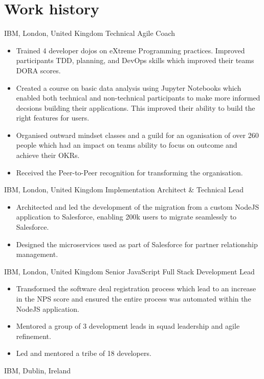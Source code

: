 \section[\faGears]{Work history}
{IBM, London, United Kingdom}
{Technical Agile Coach}
{\begin{itemize}
		\item Trained 4 developer dojos on eXtreme Programming practices.
		      Improved participants TDD, planning, and DevOps skills which improved their teams DORA scores.
		\item Created a course on basic data analysis using Jupyter Notebooks which enabled both
		      technical and non-technical participants to make more informed decsions building their applications.
		      This improved their ability to build the right features for users.
		\item Organised outward mindset classes and a guild for an oganisation of over 260 people which had an impact on teams ability to focus on outcome and achieve their OKRs.
		\item Received the Peer-to-Peer recognition for transforming the organisation.
	\end{itemize}}
{IBM, London, United Kingdom}
{Implementation Architect & Technical \newline
	Lead}
{\begin{itemize}
		\item Architected and led the development of the migration from a custom NodeJS application to Salesforce, enabling 200k users to migrate seamlessly to Salesforce.
		\item Designed the microservices used as part of Salesforce for partner relationship management.
	\end{itemize}}
{IBM, London, United Kingdom}
{Senior JavaScript Full Stack \newline
	Development Lead}
{\begin{itemize}
		\item Transformed the software deal registration process which lead to an increase in the NPS score and ensured the entire process was automated within the NodeJS application.
		\item Mentored a group of 3 development leads in squad leadership and agile refinement.
		\item Led and mentored a tribe of 18 developers.
	\end{itemize}}
{IBM, Dublin, Ireland}
